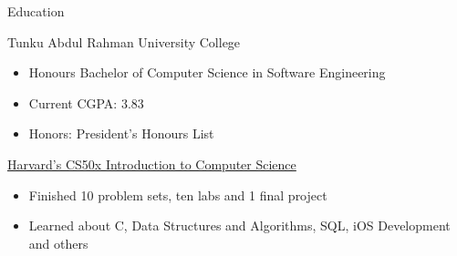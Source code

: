\documentclass{article}
\newlength{\tabin}
\newlength{\secsep}
\newcommand{\lineunder}{\vspace*{-8pt} \\ \hspace*{-6pt} \hrulefill \\ \vspace*{-15pt}}
\newenvironment{tabbedsection}[1]{
  \begin{list}{}{
      \setlength{\itemsep}{0pt}
      \setlength{\labelsep}{0pt}
      \setlength{\labelwidth}{0pt}
      \setlength{\leftmargin}{\tabin}
      \setlength{\rightmargin}{\tabin}
      \setlength{\listparindent}{0pt}
      \setlength{\parsep}{0pt}
      \setlength{\parskip}{0pt}
      \setlength{\partopsep}{0pt}
      \setlength{\topsep}{#1}
    }
  \item[]
}{\end{list}}
\newenvironment{resume_section}[1]{
  \filbreak
  \vspace{2\secsep}
  \textsc{\large#1}
  \lineunder
  \begin{tabbedsection}{\secsep}
}{\end{tabbedsection}}
\newenvironment{resume_subsection}[2][]{
  \textbf{#2} \hfill {\footnotesize #1} \hspace{2em}
  \begin{tabbedsection}{0.5\secsep}
}{\end{tabbedsection}}
\newenvironment{subitems}{
  \renewcommand{\labelitemi}{-}
  \begin{itemize}
      \setlength{\labelsep}{1em}
}{\end{itemize}}
\begin{document}
\begin{resume_section}{Education}
  \begin{resume_subsection}{Tunku Abdul Rahman University College}
    \begin{subitems}
      \item Honours Bachelor of Computer Science in Software Engineering
      \item Current CGPA: 3.83
      \item Honors: President's Honours List
    \end{subitems}
  \end{resume_subsection}

  \begin{resume_subsection}[Online (2020--2021)]{\href{https://drive.google.com/file/d/1-tVq-vD20YwCcI3YgotgKKe_UYvHTwBj/view?usp=sharing}{Harvard's CS50x Introduction to Computer Science}}
    \begin{subitems}
      \item Finished 10 problem sets, ten labs and 1 final project
      \item Learned about C, Data Structures and Algorithms, SQL, iOS Development and others
    \end{subitems}
  \end{resume_subsection}
\end{resume_section}
\end{document}
